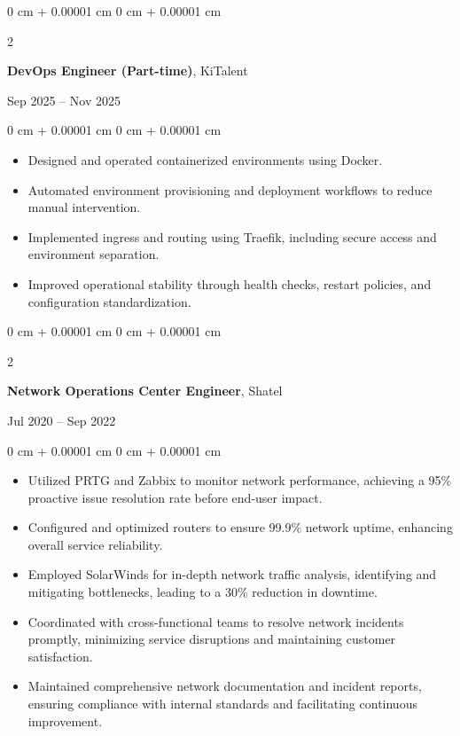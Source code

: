 \documentclass[10pt, letterpaper]{article}
\newenvironment{highlights}{
    \begin{itemize}[
        topsep=0.10 cm,
        parsep=0.10 cm,
        partopsep=0pt,
        itemsep=0pt,
        leftmargin=0 cm + 10pt
    ]
}{
    \end{itemize}
} %
\newenvironment{onecolentry}{
    \begin{adjustwidth}{
        0 cm + 0.00001 cm
    }{
        0 cm + 0.00001 cm
    }
}{
    \end{adjustwidth}
} %
\newenvironment{twocolentry}[2][]{
    \onecolentry
    \def\secondColumn{#2}
    \setcolumnwidth{\fill, 4.5 cm}
    \begin{paracol}{2}
}{
    \switchcolumn \raggedleft \secondColumn
    \end{paracol}
    \endonecolentry
} %
\begin{document}
                \begin{twocolentry}{Sep 2025 -- Nov 2025}
                    \textbf{DevOps Engineer (Part-time)}, KiTalent
                \end{twocolentry}
                \vspace{0.10 cm}
                \begin{onecolentry}
                    \begin{highlights}
                        \item Designed and operated containerized environments using Docker.
                        \item Automated environment provisioning and deployment workflows to reduce manual intervention.
                        \item Implemented ingress and routing using Traefik, including secure access and environment separation.
                        \item Improved operational stability through health checks, restart policies, and configuration standardization.
                    \end{highlights}
                \end{onecolentry}

                \vspace{0.2 cm}

                \begin{twocolentry}{Jul 2020 -- Sep 2022}
                    \textbf{Network Operations Center Engineer}, Shatel
                \end{twocolentry}
                \vspace{0.10 cm}
                \begin{onecolentry}
                    \begin{highlights}
                        \item Utilized PRTG and Zabbix to monitor network performance, achieving a 95\% proactive issue resolution rate before end-user impact.
                        \item Configured and optimized routers to ensure 99.9\% network uptime, enhancing overall service reliability.
                        \item Employed SolarWinds for in-depth network traffic analysis, identifying and mitigating bottlenecks, leading to a 30\% reduction in downtime.
                        \item Coordinated with cross-functional teams to resolve network incidents promptly, minimizing service disruptions and maintaining customer satisfaction.
                        \item Maintained comprehensive network documentation and incident reports, ensuring compliance with internal standards and facilitating continuous improvement.
                    \end{highlights}
                \end{onecolentry}
\end{document}
